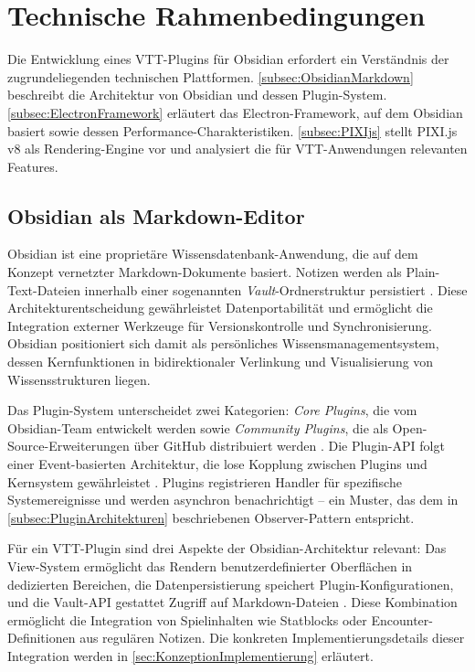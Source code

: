 \section{Technische Rahmenbedingungen}
\label{sec:TechnischeRahmenbedingungen}

Die Entwicklung eines \ac{VTT}-Plugins für Obsidian erfordert ein Verständnis der zugrundeliegenden technischen Plattformen. \autoref{subsec:ObsidianMarkdown} beschreibt die Architektur von Obsidian und dessen Plugin-System. \autoref{subsec:ElectronFramework} erläutert das Electron-Framework, auf dem Obsidian basiert sowie dessen Performance-Charakteristiken. \autoref{subsec:PIXIjs} stellt PIXI.js v8 als Rendering-Engine vor und analysiert die für \ac{VTT}-Anwendungen relevanten Features.

\subsection{Obsidian als Markdown-Editor}
\label{subsec:ObsidianMarkdown}

Obsidian ist eine proprietäre Wissensdatenbank-Anwendung, die auf dem Konzept vernetzter Markdown-Dokumente basiert. Notizen werden als Plain-Text-Dateien innerhalb einer sogenannten \textit{Vault}-Ordnerstruktur persistiert \autocite{ObsidianWiki2024}. Diese Architekturentscheidung gewährleistet Datenportabilität und ermöglicht die Integration externer Werkzeuge für Versionskontrolle und Synchronisierung. Obsidian positioniert sich damit als persönliches Wissensmanagementsystem, dessen Kernfunktionen in bidirektionaler Verlinkung und Visualisierung von Wissensstrukturen liegen.

Das Plugin-System unterscheidet zwei Kategorien: \textit{Core Plugins}, die vom Obsidian-Team entwickelt werden sowie \textit{Community Plugins}, die als Open-Source-Erweiterungen über GitHub distribuiert werden \autocite{ObsidianWiki2024}. Die Plugin-\ac{API} folgt einer Event-basierten Architektur, die lose Kopplung zwischen Plugins und Kernsystem gewährleistet \autocite{ObsidianEvents2024}. Plugins registrieren Handler für spezifische Systemereignisse und werden asynchron benachrichtigt -- ein Muster, das dem in \autoref{subsec:PluginArchitekturen} beschriebenen Observer-Pattern entspricht.

Für ein \ac{VTT}-Plugin sind drei Aspekte der Obsidian-Architektur relevant: Das View-System ermöglicht das Rendern benutzerdefinierter Oberflächen in dedizierten Bereichen, die Datenpersistierung speichert Plugin-Konfigurationen, und die Vault-\ac{API} gestattet Zugriff auf Markdown-Dateien \autocite{ObsidianVault2024}. Diese Kombination ermöglicht die Integration von Spielinhalten wie Statblocks oder Encounter-Definitionen aus regulären Notizen. Die konkreten Implementierungsdetails dieser Integration werden in \autoref{sec:KonzeptionImplementierung} erläutert.

